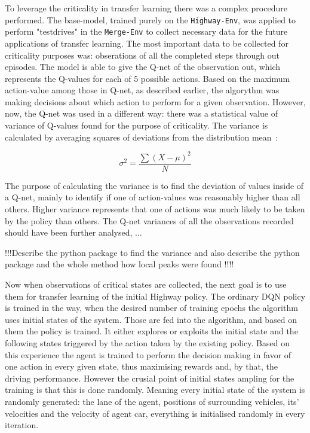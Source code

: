To leverage the criticality in transfer learning there was a complex procedure performed. The base-model, trained purely on the  \texttt{Highway-Env}, was applied to perform "testdrives" in the \texttt{Merge-Env} to collect necessary data for the future applications of transfer learning. The most important data to be collected for criticality purposes was: obserations of all the completed steps through out episodes. The model is able to give the Q-net of the observation out, which represents the Q-values for each of 5 possible actions. Based on the maximum action-value among those in Q-net, as described earlier, the algorythm was making decisions about which action to perform for a given observation. However, now, the Q-net was used in a different way: there was a statistical value of variance\cite{Karino_2020,} of Q-values found for the purpose of criticality. The variance is calculated by averaging squares of deviations from the distribution mean~\cite{variance2018}:

\[
\sigma^2 = \frac{\sum (X - \mu)^2}{N}
\]

The purpose of calculating the variance is to find the deviation of values inside of a Q-net, mainly to identify if one of action-values was reasonably higher than all others. Higher variance represents that one of actions was much likely to be taken by the policy than others. The Q-net variances of all the observations recorded should have been further analysed, ...

!!!Describe the python package to find the variance and also describe the python package and the whole method how local peaks were found !!!!

Now when observations of critical states are collected, the next goal is to use them for transfer learning of the initial Highway policy. The ordinary DQN policy is trained in the way, when the desired number of training epochs the algorithm uses initial states of the system. Those are fed into the algorithm, and based on them the policy is trained. It either explores or exploits the initial state and the following states triggered by the action taken by the existing policy. Based on this experience the agent is trained to perform the decision making in favor of one action in every given state, thus maximising rewards and, by that, the driving performance. However the crusial point of initial states ampling for the training is that this is done randomly. Meaning every initial state of the system is randomly generated: the lane of the agent, positions of surrounding vehicles, its' velocities and the velocity of agent car, everything is initialised randomly in every iteration.

